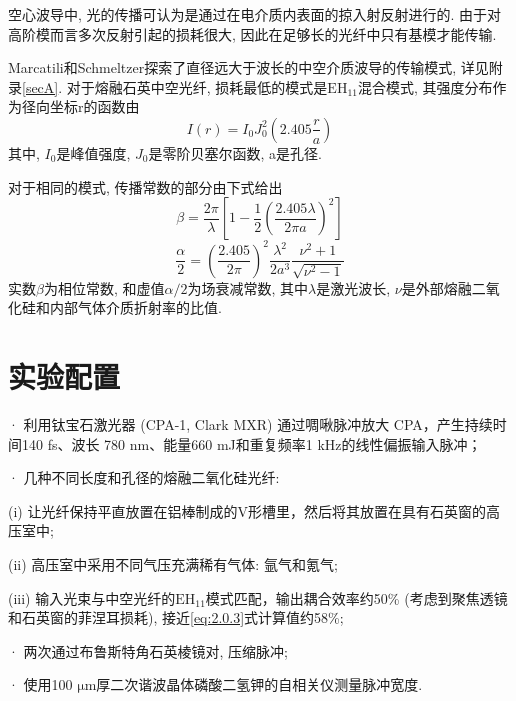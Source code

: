 \documentclass[14pt,a4paper,oneside]{article}
\numberwithin{equation}{subsection}             %
\numberwithin{figure}{subsection}               %
\begin{document}
空心波导中, 光的传播可认为是通过在电介质内表面的掠入射反射进行的. 由于对高阶模而言多次反射引起的损耗很大, 因此在足够长的光纤中只有基模才能传输. 

Marcatili和Schmeltzer探索了直径远大于波长的中空介质波导的传输模式\cite{marcatiliHollowMetallicDielectric1964}, 详见附录\ref{secA}. 对于熔融石英中空光纤, 损耗最低的模式是$\mathrm{EH_{11}}$混合模式, 其强度分布作为径向坐标r的函数由
\begin{equation}
    I(r)=I_0J_0^2(2.405\frac{r}{a})
    \label{eq:2.1.1}
\end{equation}
其中, $I_0$是峰值强度, $J_0$是零阶贝塞尔函数, a是孔径. 

对于相同的模式, 传播常数的部分由下式给出
\begin{equation}
    \beta=\frac{2\pi}\lambda\left[1-\frac12\left(\frac{2.405\lambda}{2\pi a}\right)^2\right]
    \label{eq:2.0.2}
\end{equation}
\begin{equation}
\frac\alpha2=\left(\frac{2.405}{2\pi}\right)^2\frac{\lambda^2}{2a^3}\frac{\nu^2+1}{\sqrt{\nu^2-1}}
    \label{eq:2.0.3}
\end{equation}
实数$\beta$为相位常数, 和虚值$\alpha/2$为场衰减常数, 其中$\lambda$是激光波长, $\nu$是外部熔融二氧化硅和内部气体介质折射率的比值. 




\section{实验配置}

· 利用钛宝石激光器 (CPA-1, Clark MXR) 通过啁啾脉冲放大 CPA，产生持续时间140 fs、波长 780 nm、能量660 mJ和重复频率1 kHz的线性偏振输入脉冲；

· 几种不同长度和孔径的熔融二氧化硅光纤: 

(i) 让光纤保持平直放置在铝棒制成的V形槽里，然后将其放置在具有石英窗的高压室中;

(ii) 高压室中采用不同气压充满稀有气体: 氩气和氪气;

(iii) 输入光束与中空光纤的$\mathrm{EH_{11}}$模式匹配，输出耦合效率约50\% (考虑到聚焦透镜和石英窗的菲涅耳损耗), 接近\ref{eq:2.0.3}式计算值约58\%;

· 两次通过布鲁斯特角石英棱镜对, 压缩脉冲;

· 使用100 $\mathrm{\mu m}$厚二次谐波晶体磷酸二氢钾的自相关仪测量脉冲宽度. 


\end{document}
